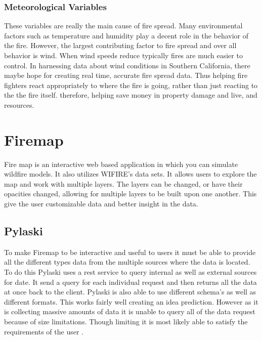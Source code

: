 \documentclass[sigconf]{acmart}
\begin{document}
\subsubsection{Meteorological Variables}
These variables are really the main cause of fire spread.  Many 
environmental factors such as temperature and humidity play a decent 
role in the behavior of the fire.  However, the largest contributing 
factor to fire spread and over all behavior is wind.  When wind speeds 
reduce typically fires are much easier to control. In harnessing data 
about wind conditions in Southern California, there maybe hope for 
creating real time, accurate fire spread data.  Thus helping fire 
fighters react appropriately to where the fire is going, rather than 
just reacting to the the fire itself. therefore, helping save money in 
property damage and live, and resources.

\section{Firemap}
Fire map is an interactive web based application in which you can 
simulate wildfire models.  It also utilizes WIFIRE's data sets.  It 
allows users to explore the map and work with multiple layers.  The 
layers can be changed, or have their opacities changed, allowing for 
multiple layers to be built upon one another.  This give the user 
customizable data and better insight in the data. 
\subsection{Pylaski}
To make Firemap to be interactive and useful to users it must be able 
to provide all the different types data from the multiple sources where 
the data is located.  To do this Pylaski uses a rest service to query 
internal as well as external sources for date.  It send a query for 
each individual request and then returns all the data at once back to 
the client.  Pylaski is also able to use different schema's as well as 
different formats.  This works fairly well creating an idea prediction.  
However as it is collecting massive amounts of data it is unable to 
query all of the data request because of size limitations.  Though 
limiting it is most likely able to satisfy the requirements of the user 
\cite{CRAWLFiremap}. 
\end{document}

